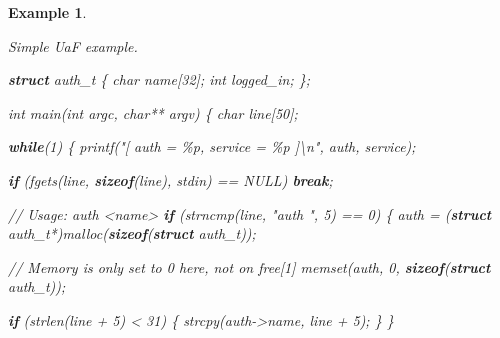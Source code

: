 \documentclass[
  a4paper,
]{report}
\newtheorem{example}{Example}
\newenvironment{Shaded}{}{}
\newcommand{\CommentTok}[1]{\textcolor[rgb]{0.38,0.63,0.69}{\textit{#1}}}
\newcommand{\ControlFlowTok}[1]{\textcolor[rgb]{0.00,0.44,0.13}{\textbf{#1}}}
\newcommand{\DataTypeTok}[1]{\textcolor[rgb]{0.56,0.13,0.00}{#1}}
\newcommand{\DecValTok}[1]{\textcolor[rgb]{0.25,0.63,0.44}{#1}}
\newcommand{\KeywordTok}[1]{\textcolor[rgb]{0.00,0.44,0.13}{\textbf{#1}}}
\newcommand{\NormalTok}[1]{#1}
\newcommand{\OperatorTok}[1]{\textcolor[rgb]{0.40,0.40,0.40}{#1}}
\newcommand{\SpecialCharTok}[1]{\textcolor[rgb]{0.25,0.44,0.63}{#1}}
\newcommand{\StringTok}[1]{\textcolor[rgb]{0.25,0.44,0.63}{#1}}
\begin{document}
\label{ex:use-after-free}
\begin{example}

\label{ex:use-after-free}

\textup{Simple UaF example.}

\begin{Shaded}
\begin{Highlighting}[]
\KeywordTok{struct}\NormalTok{ auth\_t }\OperatorTok{\{}
  \DataTypeTok{char}\NormalTok{ name}\OperatorTok{[}\DecValTok{32}\OperatorTok{];}
  \DataTypeTok{int}\NormalTok{ logged\_in}\OperatorTok{;}
\OperatorTok{\};}
 
\DataTypeTok{int}\NormalTok{ main}\OperatorTok{(}\DataTypeTok{int}\NormalTok{ argc}\OperatorTok{,} \DataTypeTok{char}\OperatorTok{**}\NormalTok{ argv}\OperatorTok{)} \OperatorTok{\{}
  \DataTypeTok{char}\NormalTok{ line}\OperatorTok{[}\DecValTok{50}\OperatorTok{];}
 
  \ControlFlowTok{while}\OperatorTok{(}\DecValTok{1}\OperatorTok{)} \OperatorTok{\{}
\NormalTok{    printf}\OperatorTok{(}\StringTok{"[ auth = }\SpecialCharTok{\%p}\StringTok{, service = }\SpecialCharTok{\%p}\StringTok{ ]}\SpecialCharTok{\textbackslash{}n}\StringTok{"}\OperatorTok{,}\NormalTok{ auth}\OperatorTok{,}\NormalTok{ service}\OperatorTok{);}
 
    \ControlFlowTok{if} \OperatorTok{(}\NormalTok{fgets}\OperatorTok{(}\NormalTok{line}\OperatorTok{,} \KeywordTok{sizeof}\OperatorTok{(}\NormalTok{line}\OperatorTok{),}\NormalTok{ stdin}\OperatorTok{)} \OperatorTok{==}\NormalTok{ NULL}\OperatorTok{)} \ControlFlowTok{break}\OperatorTok{;}
 
    \CommentTok{// Usage: auth \textless{}name\textgreater{}}
    \ControlFlowTok{if} \OperatorTok{(}\NormalTok{strncmp}\OperatorTok{(}\NormalTok{line}\OperatorTok{,} \StringTok{"auth "}\OperatorTok{,} \DecValTok{5}\OperatorTok{)} \OperatorTok{==} \DecValTok{0}\OperatorTok{)} \OperatorTok{\{}
\NormalTok{      auth }\OperatorTok{=} \OperatorTok{(}\KeywordTok{struct}\NormalTok{ auth\_t}\OperatorTok{*)}\NormalTok{malloc}\OperatorTok{(}\KeywordTok{sizeof}\OperatorTok{(}\KeywordTok{struct}\NormalTok{ auth\_t}\OperatorTok{));}

      \CommentTok{// Memory is only set to 0 here, not on free[1]}
\NormalTok{      memset}\OperatorTok{(}\NormalTok{auth}\OperatorTok{,} \DecValTok{0}\OperatorTok{,} \KeywordTok{sizeof}\OperatorTok{(}\KeywordTok{struct}\NormalTok{ auth\_t}\OperatorTok{));}

      \ControlFlowTok{if} \OperatorTok{(}\NormalTok{strlen}\OperatorTok{(}\NormalTok{line }\OperatorTok{+} \DecValTok{5}\OperatorTok{)} \OperatorTok{\textless{}} \DecValTok{31}\OperatorTok{)} \OperatorTok{\{}
\NormalTok{        strcpy}\OperatorTok{(}\NormalTok{auth}\OperatorTok{{-}\textgreater{}}\NormalTok{name}\OperatorTok{,}\NormalTok{ line }\OperatorTok{+} \DecValTok{5}\OperatorTok{);}
      \OperatorTok{\}}
    \OperatorTok{\}}
 

\end{Highlighting}
\end{Shaded}
\end{example}
\end{document}
